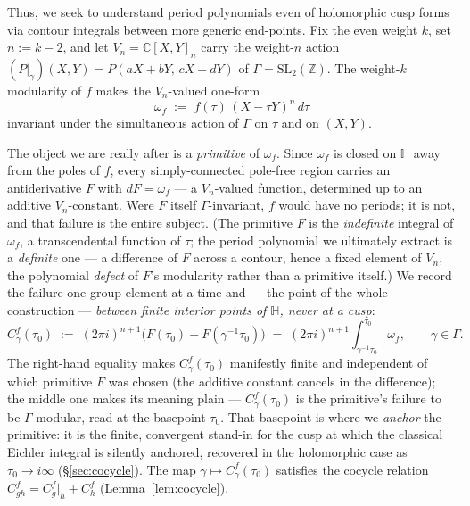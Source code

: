 \documentclass[11pt]{article}
\numberwithin{equation}{section}  %
\newcommand{\HH}{\mathbb{H}}
\newcommand{\ZZ}{\mathbb{Z}}
\newcommand{\CC}{\mathbb{C}}
\newcommand{\SLZ}{\mathrm{SL}_2(\ZZ)}
\begin{document}
Thus, we seek to understand period polynomials even 
of holomorphic cusp forms via contour integrals between more generic end-points. 
Fix the even weight $k$, set $n := k-2$, and let $V_n = \CC[X,Y]_n$ carry
the weight-$n$ action $(P|_\gamma)(X,Y) = P(aX+bY,\,cX+dY)$ of
$\Gamma = \SLZ$.  The weight-$k$ modularity of $f$ makes the $V_n$-valued
one-form
\begin{equation}\label{eq:omega-f}
  \omega_f \;:=\; f(\tau)\,(X - \tau Y)^n\,d\tau
\end{equation}
invariant under the simultaneous action of $\Gamma$ on $\tau$ and on
$(X,Y)$.

The object we are really after is a \emph{primitive} of $\omega_f$.  Since
$\omega_f$ is closed on $\HH$ away from the poles of $f$, every
simply-connected pole-free region carries an antiderivative $F$ with
$dF = \omega_f$ --- a $V_n$-valued function, determined up to an additive
$V_n$-constant.  Were $F$ itself $\Gamma$-invariant, $f$ would have no
periods; it is not, and that failure is the entire subject.  (The
primitive $F$ is the \emph{indefinite} integral of $\omega_f$, a
transcendental function of $\tau$; the period polynomial we ultimately
extract is a \emph{definite} one --- a difference of $F$ across a contour,
hence a fixed element of $V_n$, the polynomial \emph{defect} of $F$'s
modularity rather than a primitive itself.)  We record the
failure one group element at a time and --- the point of the whole
construction --- \emph{between finite interior points of $\HH$, never at a
cusp}:
\begin{equation}\label{eq:ES-cocycle}
  C^f_\gamma(\tau_0)
  \;:=\; (2\pi i)^{n+1}\bigl(F(\tau_0) - F(\gamma^{-1}\tau_0)\bigr)
  \;=\; (2\pi i)^{n+1}\!\int_{\gamma^{-1}\tau_0}^{\tau_0}\!\omega_f,
  \qquad \gamma \in \Gamma.
\end{equation}
The right-hand equality makes $C^f_\gamma(\tau_0)$ manifestly finite and
independent of which primitive $F$ was chosen (the additive constant
cancels in the difference); the middle one makes its meaning plain ---
$C^f_\gamma(\tau_0)$ is the primitive's failure to be $\Gamma$-modular,
read at the basepoint $\tau_0$.  That basepoint is where we \emph{anchor}
the primitive: it is the finite, convergent stand-in for the cusp at which
the classical Eichler integral is silently anchored, recovered in the
holomorphic case as $\tau_0 \to i\infty$ (\S\ref{sec:cocycle}).  The map
$\gamma \mapsto C^f_\gamma(\tau_0)$ satisfies the cocycle relation
$C^f_{gh} = C^f_g|_h + C^f_h$ (Lemma~\ref{lem:cocycle}).
\end{document}
